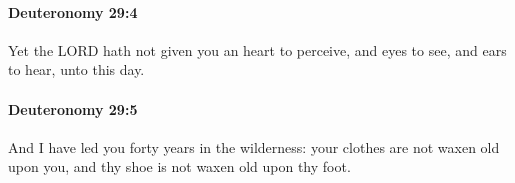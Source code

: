 		\paragraph{Deuteronomy 29:4} %
			\label{DEUTERONOMY-29-4}

			Yet the LORD hath not given you an heart to perceive, and eyes to see, and ears to hear, unto this day.


		\paragraph{Deuteronomy 29:5} %
			\label{DEUTERONOMY-29-5}

			And I have led you forty years in the wilderness: your clothes are not waxen old upon you, and thy shoe is not waxen old upon thy foot.


